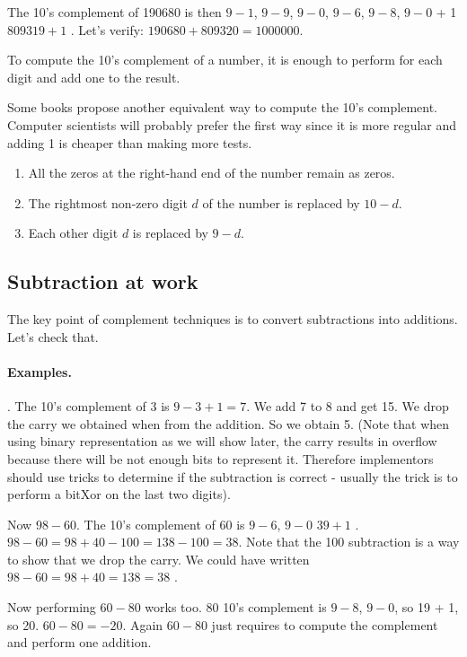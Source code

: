 \documentclass[a4paper,10pt,twoside]{book}
\begin{document}
The 10's complement of 190680 is then $9-1$, $9-9$, $9-0$, $9-6$, $9-8$, $9-0$ + 1 \ie $809319 + 1$ . Let's verify: $190680 + 809320 = 1000000$.
 
To compute the 10's complement of a number, it is enough to perform  for each digit and add one to the result.


Some books propose another equivalent way to compute the 10's complement. Computer scientists will probably prefer the first way since it is more regular and adding 1 is cheaper than making more tests.
\begin{enumerate}
\item All the zeros at the right-hand end of the number remain as zeros. 
\item The rightmost non-zero digit $d$ of the number is replaced by $10 - d$. 
\item Each other digit $d$ is replaced by $9 - d$. 
\end{enumerate}




\subsection{Subtraction at work}
The key point of complement techniques is to convert subtractions into additions. Let's check that.

\paragraph{Examples.}
. The 10's complement of 3 is $9 - 3 + 1 = 7$. We add 7 to 8 and get 15. 
We drop the carry we obtained when from the addition. So we obtain 5. (Note that when using binary representation as we will show later, the carry results in overflow because there will be not enough bits to represent it. Therefore implementors should use tricks to determine if the subtraction is correct - usually the trick is to perform a bitXor on the last two digits).

Now $98-60$. The 10's complement of 60 is $9-6$, $9-0$ \ie $39 + 1$ . 
 $98-60 = 98 + 40 - 100 = 138 - 100 = 38$. Note that the 100 subtraction is a way to show that we drop the carry. 
 We could have written $98-60 = 98 + 40 = 138 = 38$ .


Now performing $60-80$ works too. 80 10's complement is $9-8$, $9-0$, so 19 + 1, so 20.
$60 - 80 = -20$. Again $60-80$ just requires to compute the complement and perform one addition.
\end{document}
